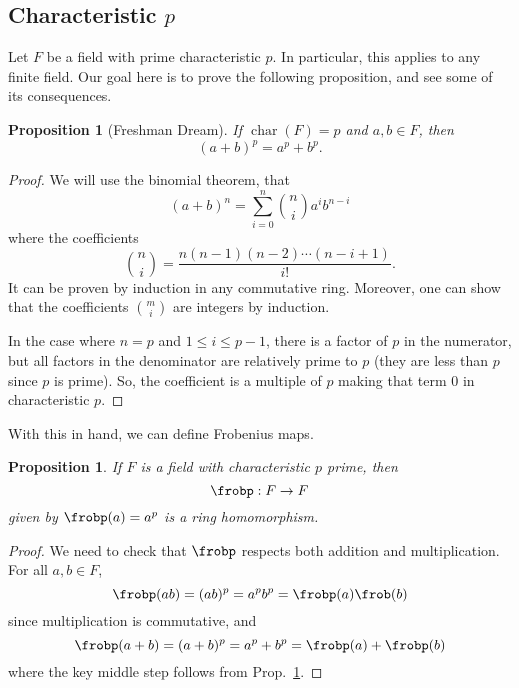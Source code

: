 \documentclass[12pt]{amsart}
\DeclareMathOperator{\chr}{char}
\theoremstyle{plain}
\newtheorem{prop}[thm]{Proposition}
\theoremstyle{definition}
\theoremstyle{remark}
\begin{document}
\subsection{Characteristic $p$}
Let $F$ be a field with prime characteristic $p$.  In particular, this
applies to any finite field.  Our goal here is to prove the following
proposition, and see some of its consequences.
\begin{prop}[Freshman Dream]
\label{dream}
If $\chr(F)=p$ and $a,b\in F$, then
\[ (a+b)^p=a^p+b^p.\]
\end{prop}
\begin{proof} 
We will use the binomial theorem, that
\[ (a+b)^n=\sum_{i=0}^n \binom{n}{i} a^ib^{n-i}\]
where the coefficients
\[ \binom{n}{i} = \frac{n(n-1)(n-2)\cdots(n-i+1)}{i!}.\]
It can be proven by induction in any commutative ring.  Moreover, one
can show that the coefficients $\binom m i$ are integers by induction.

In the case where $n=p$ and $1\leq i\leq p-1$, there is a factor of
$p$ in the numerator, but all factors in the denominator are
relatively prime to $p$ (they are less than $p$ since $p$ is prime).
So, the coefficient is a multiple of $p$ making that term $0$ in
characteristic $p$.
\end{proof}
With this in hand, we can define Frobenius maps.
\begin{prop}
  If $F$ is a field with characteristic $p$ prime, then
  \[ \frobp: F\to F\]
  given by $\frobp(a)=a^p$ is a ring homomorphism.
\end{prop}
\begin{proof}
  We need to check that $\frobp$ respects both addition and
  multiplication.  For all $a,b\in F$,
  \[ \frobp(ab)=(ab)^p=a^pb^p=\frobp(a)\frob(b)\]
  since multiplication is commutative, and
  \[  \frobp(a+b) = (a+b)^p = a^p+b^p=\frobp(a)+\frobp(b)\]
  where the key middle step follows from Prop.~\ref{dream}.
\end{proof}
\end{document}
